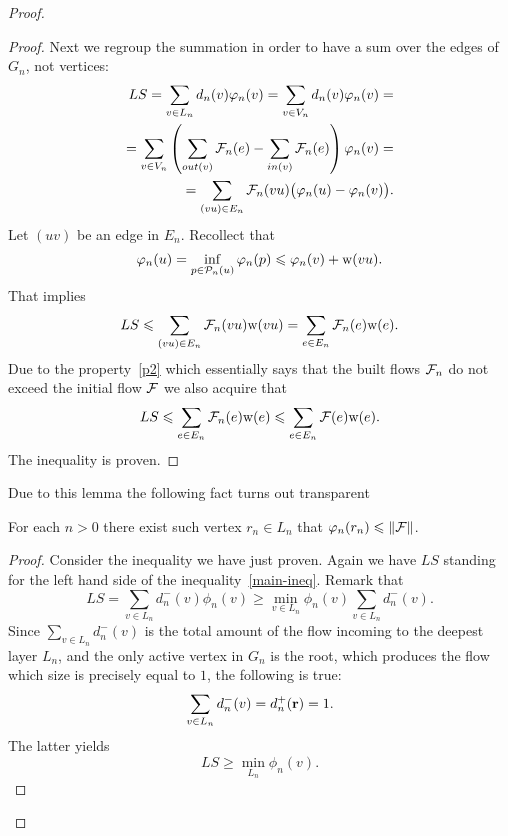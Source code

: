\documentclass[12pt]{article}
\begin{document}
\begin{proof}
\begin{proof}
        Next we regroup the summation in order to have a sum over the edges of $G_n$, not vertices:
        \begin{align*}
          LS = \sum\limits_{v \in L_n} d_n(v) \varphi_n(v) = \sum\limits_{v \in V_n} d_n(v) \varphi_n(v) =\\
          =\sum_{v \in V_n} \left(\sum_{out(v)} \mathcal{F}_{n}(e) - \sum_{in(v)}\mathcal{F}_{n}(e) \right) \varphi_n(v)=\\
          =\sum_{(vu) \in E_n} \mathcal{F}_{n}(vu) \big(\varphi_n(u) - \varphi_n(v)\big).
        \end{align*}
        Let $(uv)$ be an edge in $E_n$. Recollect that
        \[
          \varphi_n(u) = \inf_{p \in \mathcal{P}_n(u)} \varphi_n(p) \leqslant \varphi_n(v) + \mathrm{w}(vu).
        \]
        That implies
        \[
          LS\leqslant \sum_{(vu) \in E_n} \mathcal{F}_{n}(vu) \mathrm{w}(vu) = \sum_{e \in E_n} \mathcal{F}_{n}(e) \mathrm{w}(e).
        \]
        Due to the property~\ref{p2} which essentially says that the built flows $\mathcal{F}_{n}$ do not exceed the initial flow $\mathcal{F}$ 
          we also acquire that
        \[
          LS\leqslant \sum_{e \in E_n} \mathcal{F}_{n}(e) \mathrm{w}(e) \leqslant \sum_{e \in E_n} \mathcal{F}(e) \mathrm{w}(e).
        \]
        The inequality is proven.
      \end{proof}
      Due to this lemma the following fact turns out transparent
      \begin{prop}
        For each $n > 0$ there exist such vertex $r_n \in L_n$ that $\varphi_n(r_n) \leqslant \|\mathcal{F}\|$.
      \end{prop}
      \begin{proof}
        Consider the inequality we have just proven.
        Again we have $LS$ standing for the left hand side of the inequality~\eqref{main-ineq}.
        Remark that
        \[
          LS = \sum_{v \in L_n}d^{-}_n(v) \phi_n(v) \geq \min_{v \in L_n}\phi_n(v) \sum_{v \in L_n} d^{-}_n(v).
        \]
        Since $\sum\limits_{v \in L_n} d^{-}_n(v)$ is the total amount of the flow incoming to the deepest layer $L_n$, and the only
          active vertex in $G_n$ is the root, which produces the flow which size is precisely equal to $1$, the following is true:
        \[
          \sum_{v \in L_n} d^{-}_n(v) = d^{+}_n(\mathbf{r}) = 1.
        \]
        The latter yields
        \[
          LS \geq \min_{L_n} \phi_n(v).
        \]


\end{proof}
\end{proof}
\end{document}
